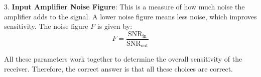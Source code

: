 3. \textbf{Input Amplifier Noise Figure}: This is a measure of how much noise the amplifier adds to the signal. A lower noise figure means less noise, which improves sensitivity. The noise figure \( F \) is given by:
\[ F = \frac{\text{SNR}_{\text{in}}}{\text{SNR}_{\text{out}}} \]

All these parameters work together to determine the overall sensitivity of the receiver. Therefore, the correct answer is that all these choices are correct.

